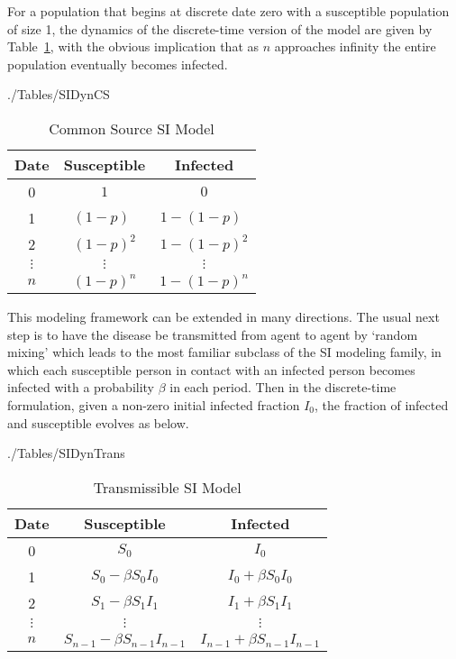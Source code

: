 For a population that begins at discrete date zero with a susceptible population of size 1, the dynamics of the discrete-time version of the model are given by Table~\ref{table:SIDyn}, with the obvious implication that as $n$ approaches infinity the entire population eventually becomes infected.

\begin{verbatimwrite}{./Tables/SIDynCS}
\begin{table}[h]\label{table:SIDyn}
\centering
\caption{Common Source SI Model}\medskip
    \begin{tabular}{ccc}
        \hline
        Date & Susceptible & Infected \\
        \hline
        0 & $1$  &  $0$ \\
        \hline
        1 & $(1-p)\phantom{^2}$ & $1-(1-p)\phantom{^2}$ \\
        \hline
        2 & $(1-p)^{2}$ & $1-(1-p)^{2}$ \\
        \hline
        $\vdots$ & $\vdots$ & $\vdots$ \\
        \hline
        $n$ & $(1-p)^{n}$ & $1-(1-p)^{n}$ \\
        \hline
    \end{tabular}
\end{table}
\end{verbatimwrite}


This modeling framework can be extended in many directions.  The usual next step is to have the disease be transmitted from agent to agent by `random mixing' which leads to the most familiar subclass of the SI modeling family, in which each susceptible person in contact with an infected person becomes infected with a probability $\beta$ in each period. Then in the discrete-time formulation, given a non-zero initial infected fraction $I_0$, the fraction of infected and susceptible evolves as below.

\begin{verbatimwrite}{./Tables/SIDynTrans}
\begin{table}[h]\label{table:SIDynTrans}
    \medskip
\caption{Transmissible SI Model}
\centering\medskip
	\begin{tabular}{ccc}
			\hline
		Date & Susceptible & Infected \\
			\hline
		0 & $S_0$  &  $I_0$ \\
			\hline
		1 & $S_0 - \beta S_0I_0$ & $I_0+\beta S_0I_0$ \\
			\hline
		2 & $S_1-\beta S_1I_1$ & $I_1+\beta S_1I_1$ \\
			\hline
		$\vdots$ & $\vdots$ & $\vdots$ \\
			\hline
		$n$ & $S_{n-1}-\beta S_{n-1}I_{n-1}$ & $I_{n-1}+\beta S_{n-1}I_{n-1}$ \\
			\hline
	\end{tabular}
\end{table}
\end{verbatimwrite}


